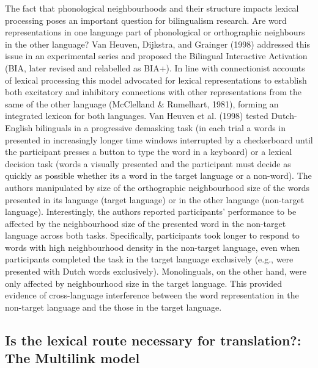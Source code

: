 \documentclass[
  english,
  man,floatsintext]{apa6}
\begin{document}
The fact that phonological neighbourhoods and their structure impacts lexical processing poses an important question for bilingualism research. Are word representations in one language part of phonological or orthographic neighbours in the other language? Van Heuven, Dijkstra, and Grainger (1998) addressed this issue in an experimental series and proposed the Bilingual Interactive Activation (BIA, later revised and relabelled as BIA+). In line with connectionist accounts of lexical processing this model advocated for lexical representations to establish both excitatory and inhibitory connections with other representations from the same of the other language (McClelland \& Rumelhart, 1981), forming an integrated lexicon for both languages. Van Heuven et al. (1998) tested Dutch-English bilinguals in a progressive demasking task (in each trial a words in presented in increasingly longer time windows interrupted by a checkerboard until the participant presses a button to type the word in a keyboard) or a lexical decision task (words a visually presented and the participant must decide as quickly as possible whether its a word in the target language or a non-word). The authors manipulated by size of the orthographic neighbourhood size of the words presented in its language (target language) or in the other language (non-target language). Interestingly, the authors reported participants' performance to be affected by the neighbourhood size of the presented word in the non-target language across both tasks. Specifically, participants took longer to respond to words with high neighbourhood density in the non-target language, even when participants completed the task in the target language exclusively (e.g., were presented with Dutch words exclusively). Monolinguals, on the other hand, were only affected by neighbourhood size in the target language. This provided evidence of cross-language interference between the word representation in the non-target language and the those in the target language.

\hypertarget{is-the-lexical-route-necessary-for-translation-the-multilink-model}{%
\subsection{Is the lexical route necessary for translation?: The Multilink model}\label{is-the-lexical-route-necessary-for-translation-the-multilink-model}}
\end{document}
